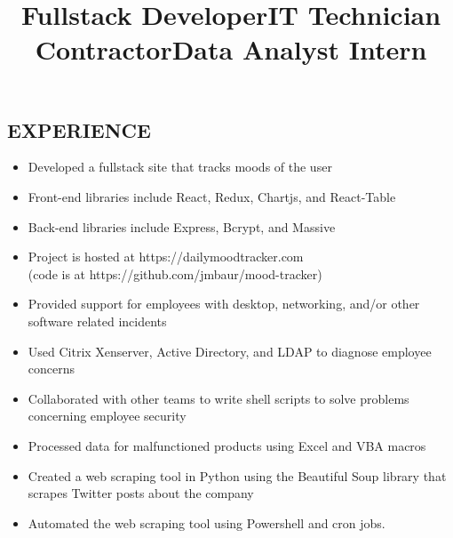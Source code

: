 \documentclass[margin]{res}
\begin{document}
\begin{resume}
\section{EXPERIENCE}
\title{\textbf{Fullstack Developer}}
\begin{position}
    \begin{itemize}
        \item Developed a fullstack site that tracks moods of the user
        \item Front-end libraries include React, Redux, Chartjs, and React-Table
        \item Back-end libraries include Express, Bcrypt, and Massive
        \item Project is hosted at https://dailymoodtracker.com\\(code is at https://github.com/jmbaur/mood-tracker)
    \end{itemize}
\end{position}

\title{\textbf{IT Technician} Contractor}
\begin{position}
	\begin{itemize}
        \item Provided support for employees with desktop, networking, and/or other software related incidents
        \item Used Citrix Xenserver, Active Directory, and LDAP to diagnose employee concerns
        \item Collaborated with other teams to write shell scripts to solve problems concerning employee security
	\end{itemize}
\end{position}

\title{\textbf{Data Analyst} Intern}
\begin{position}
	\begin{itemize}
        \item Processed data for malfunctioned products using Excel and VBA macros
        \item Created a web scraping tool in Python using the Beautiful Soup library that scrapes Twitter posts about the company
        \item Automated the web scraping tool using Powershell and cron jobs.
	\end{itemize}
\end{position}


\end{resume}
\end{document}

